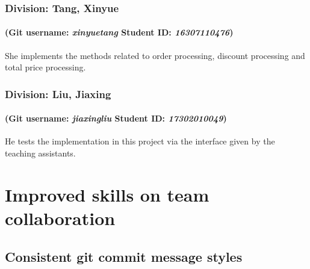 \documentclass[a4paper]{report}
\begin{document}
\subsection{Division: Tang, Xinyue}
\subsubsection{(Git username: \emph{xinyuetang} Student ID: \emph{16307110476})}
She implements the methods related to order processing, discount processing and total price processing.

\subsection{Division: Liu, Jiaxing}
\subsubsection{(Git username: \emph{jiaxingliu} Student ID: \emph{17302010049})}
He tests the implementation in this project via the interface given by the teaching assistants.

\chapter{Improved skills on team collaboration}
\section{Consistent git commit message styles}
\end{document}
